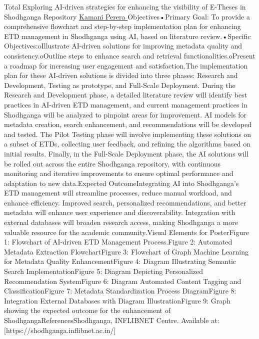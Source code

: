 \begin{abstract_online}{Total Exploring AI-driven strategies for enhancing the visibility of E-Theses in Shodhganga Repository}{%
        \underline{Kamani Perera }}
      Objectives•Primary Goal: To provide a comprehensive flowchart and step-by-step implementation plan for enhancing ETD management in Shodhganga using AI, based on literature review.•Specific Objectives:oIllustrate AI-driven solutions for improving metadata quality and consistency.oOutline steps to enhance search and retrieval functionalities.oPresent a roadmap for increasing user engagement and satisfaction.The implementation plan for these AI-driven solutions is divided into three phases: Research and Development, Testing as prototype, and Full-Scale Deployment. During the Research and Development phase, a detailed literature review will identify best practices in AI-driven ETD management, and current management practices in Shodhganga will be analyzed to pinpoint areas for improvement. AI models for metadata creation, search enhancement, and recommendations will be developed and tested. The Pilot Testing phase will involve implementing these solutions on a subset of ETDs, collecting user feedback, and refining the algorithms based on initial results. Finally, in the Full-Scale Deployment phase, the AI solutions will be rolled out across the entire Shodhganga repository, with continuous monitoring and iterative improvements to ensure optimal performance and adaptation to new data.Expected OutcomeIntegrating AI into Shodhganga’s ETD management will streamline processes, reduce manual workload, and enhance efficiency. Improved search, personalized recommendations, and better metadata will enhance user experience and discoverability. Integration with external databases will broaden research access, making Shodhganga a more valuable resource for the academic community.Visual Elements for PosterFigure 1: Flowchart of AI-driven ETD Management Process.Figure 2: Automated Metadata Extraction FlowchartFigure 3: Flowchart of Graph Machine Learning for Metadata Quality EnhancementFigure 4: Diagram Illustrating Semantic Search ImplementationFigure 5: Diagram Depicting Personalized Recommendation SystemFigure 6: Diagram Automated Content Tagging and ClassificationFigure 7: Metadata Standardization Process DiagramFigure 8: Integration External Databases with Diagram IllustrationFigure 9: Graph showing the expected outcome for the enhancement of ShodhgangaReferencesShodhganga, INFLIBNET Centre. Available at: [https://shodhganga.inflibnet.ac.in/]
    \end{abstract_online}
    
